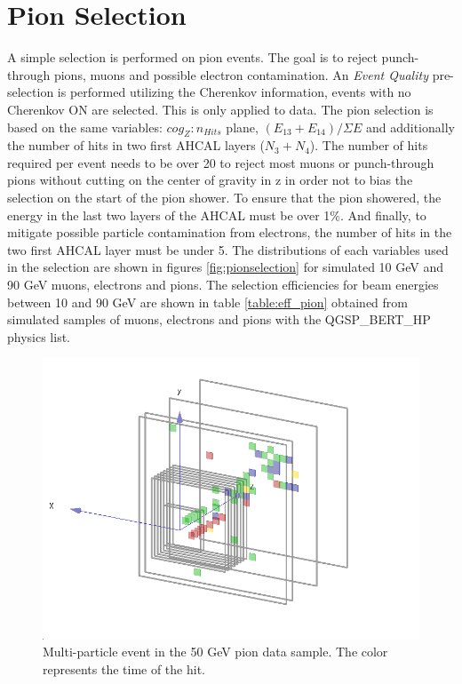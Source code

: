 \section{Pion Selection}

A simple selection is performed on pion events. The goal is to reject punch-through pions, muons and possible electron contamination. An \textit{Event Quality} pre-selection is performed utilizing the Cherenkov information, events with no Cherenkov ON are selected. This is only applied to data. The pion selection is based on the same variables: $cog_Z:n_{Hits}$ plane, $(E_{13}+E_{14})/\Sigma E$ and additionally the number of hits in two first AHCAL layers ($N_3+N_4$). The number of hits required per event needs to be over 20 to reject most muons or punch-through pions without cutting on the center of gravity in z in order not to bias the selection on the start of the pion shower. To ensure that the pion showered, the energy in the last two layers of the AHCAL must be over 1\%. And finally, to mitigate possible particle contamination from electrons, the number of hits in the two first AHCAL layer must be under 5. The distributions of each variables used in the selection are shown in figures \ref{fig:pionselection} for simulated 10 GeV and 90 GeV muons, electrons and pions. The selection efficiencies for beam energies between 10 and 90 GeV are shown in table \ref{table:eff_pion} obtained from simulated samples of muons, electrons and pions with the QGSP\_BERT\_HP physics list.

\begin{figure}[htbp!]
	\centering
	\includegraphics[width=0.7\linewidth]{chap5/fig_AHCAL_timing/Pions/DoubleParticleEventPions.png}
	\caption{Multi-particle event in the 50 GeV pion data sample. The color represents the time of the hit.} \label{fig:DoubleParticleEvent}
\end{figure}

